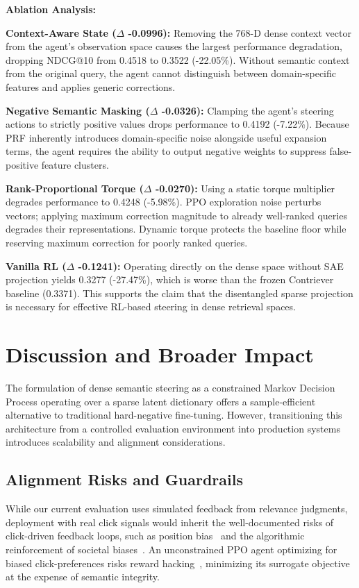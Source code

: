\documentclass[sigconf]{acmart}
\begin{document}
\textbf{Ablation Analysis:}

\textbf{Context-Aware State ($\Delta$ -0.0996):} Removing the 768-D dense context vector from the agent's observation space causes the largest performance degradation, dropping NDCG@10 from 0.4518 to 0.3522 (-22.05\%). Without semantic context from the original query, the agent cannot distinguish between domain-specific features and applies generic corrections.

\textbf{Negative Semantic Masking ($\Delta$ -0.0326):} Clamping the agent's steering actions to strictly positive values drops performance to 0.4192 (-7.22\%). Because PRF inherently introduces domain-specific noise alongside useful expansion terms, the agent requires the ability to output negative weights to suppress false-positive feature clusters.

\textbf{Rank-Proportional Torque ($\Delta$ -0.0270):} Using a static torque multiplier degrades performance to 0.4248 (-5.98\%). PPO exploration noise perturbs vectors; applying maximum correction magnitude to already well-ranked queries degrades their representations. Dynamic torque protects the baseline floor while reserving maximum correction for poorly ranked queries.

\textbf{Vanilla RL ($\Delta$ -0.1241):} Operating directly on the dense space without SAE projection yields 0.3277 (-27.47\%), which is worse than the frozen Contriever baseline (0.3371). This supports the claim that the disentangled sparse projection is necessary for effective RL-based steering in dense retrieval spaces.

\section{Discussion and Broader Impact}

The formulation of dense semantic steering as a constrained Markov Decision Process operating over a sparse latent dictionary offers a sample-efficient alternative to traditional hard-negative fine-tuning. However, transitioning this architecture from a controlled evaluation environment into production systems introduces scalability and alignment considerations.

\subsection{Alignment Risks and Guardrails}

While our current evaluation uses simulated feedback from relevance judgments, deployment with real click signals would inherit the well-documented risks of click-driven feedback loops, such as position bias~\cite{craswell2008, joachims2017} and the algorithmic reinforcement of societal biases~\cite{baeza-yates2018, noble2018}. An unconstrained PPO agent optimizing for biased click-preferences risks reward hacking~\cite{amodei2016, skalse2022}, minimizing its surrogate objective at the expense of semantic integrity.
\end{document}

